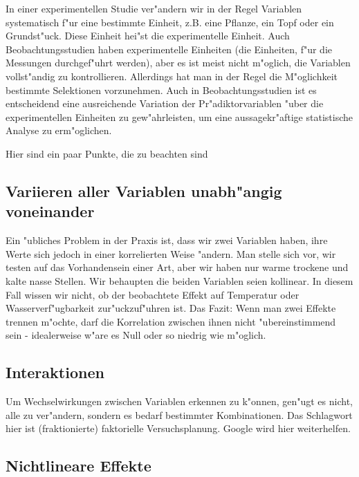 \documentclass[a4paper,twoside]{tufte-book}\usepackage[]{graphicx}\usepackage[]{color}
\begin{document}
In einer experimentellen Studie ver"andern wir in der Regel Variablen systematisch f"ur eine bestimmte Einheit, z.B. eine Pflanze, ein Topf oder ein Grundst"uck. Diese Einheit hei"st die experimentelle Einheit. Auch Beobachtungsstudien haben experimentelle Einheiten (die Einheiten, f"ur die Messungen durchgef"uhrt werden), aber es ist meist nicht m"oglich, die Variablen vollst"andig zu kontrollieren. Allerdings hat man in der Regel die M"oglichkeit bestimmte Selektionen vorzunehmen. Auch in Beobachtungsstudien ist es entscheidend eine ausreichende Variation der Pr"adiktorvariablen "uber die experimentellen Einheiten zu gew"ahrleisten, um eine aussagekr"aftige statistische Analyse zu erm"oglichen.

Hier sind ein paar Punkte, die zu beachten sind

\subsection{Variieren aller Variablen unabh"angig voneinander}

Ein "ubliches Problem in der Praxis ist, dass wir zwei Variablen haben, ihre Werte sich jedoch in einer korrelierten Weise "andern. Man stelle sich vor, wir testen auf das Vorhandensein einer Art, aber wir haben nur warme trockene und kalte nasse Stellen. Wir behaupten die beiden Variablen seien kollinear. In diesem Fall wissen wir nicht, ob der beobachtete Effekt auf Temperatur oder Wasserverf"ugbarkeit zur"uckzuf"uhren ist. Das Fazit: Wenn man zwei Effekte trennen m"ochte, darf die Korrelation zwischen ihnen nicht "ubereinstimmend sein - idealerweise w"are es Null oder so niedrig wie m"oglich. 

\subsection{Interaktionen}

Um Wechselwirkungen zwischen Variablen erkennen zu k"onnen, gen"ugt es nicht, alle zu ver"andern, sondern es bedarf bestimmter Kombinationen. Das Schlagwort hier ist (fraktionierte) faktorielle Versuchsplanung. Google wird hier weiterhelfen.

\subsection{Nichtlineare Effekte}
\end{document}

